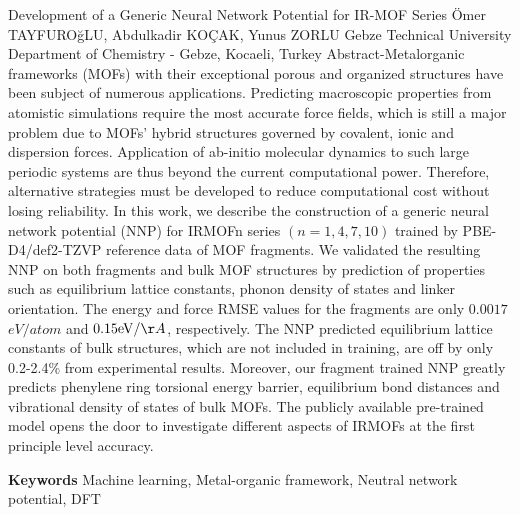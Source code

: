 
    \begin{abstract_online}{Development of a Generic Neural Network Potential for IR-MOF Series}{%
        Ömer TAYFUROğLU, Abdulkadir KOÇAK, Yunus ZORLU}{%
        }{%
        Gebze Technical University Department of Chemistry - Gebze, Kocaeli, Turkey}
    Abstract-Metalorganic frameworks (MOFs) with their exceptional porous and organized structures have been subject of numerous applications. Predicting macroscopic properties from atomistic simulations require the most accurate force fields, which is still a major problem due to MOFs' hybrid structures governed by covalent, ionic and dispersion forces. Application of ab-initio molecular dynamics to such large periodic systems are thus beyond the current computational power. Therefore, alternative strategies must be developed to reduce computational cost without losing reliability. In this work, we describe the construction of a generic neural network potential (NNP) for IRMOFn series $(n=1,4,7,10)$ trained by PBE-D4/def2-TZVP reference data of MOF fragments. We validated the resulting NNP on both fragments and bulk MOF structures by prediction of properties such as equilibrium lattice constants, phonon density of states and linker orientation. The energy and force RMSE values for the fragments are only $0.0017$ $e V / a t o m$ and $0.15 \mathrm{eV} / \AA$, respectively. The NNP predicted equilibrium lattice constants of bulk structures, which are not included in training, are off by only 0.2-2.4\% from experimental results. Moreover, our fragment trained NNP greatly predicts phenylene ring torsional energy barrier, equilibrium bond distances and vibrational density of states of bulk MOFs. The publicly available pre-trained model opens the door to investigate different aspects of IRMOFs at the first principle level accuracy. 
    
        \textbf{Keywords} \newline{}Machine learning, Metal-organic framework, Neutral network potential, DFT
    \end{abstract_online}
    